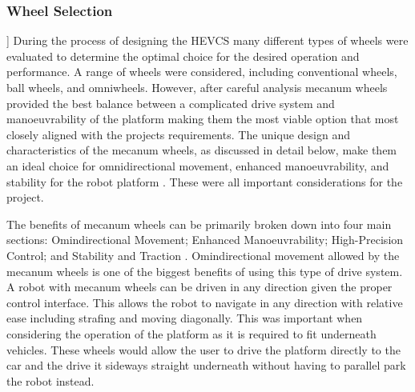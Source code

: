 \documentclass [12pt]{article}
\begin{document}
\subsubsection{Wheel Selection}]
During the process of designing the HEVCS many different types of wheels were evaluated to determine the optimal choice for the desired operation and performance. A range of wheels were considered, including conventional wheels, ball wheels, and omniwheels. However, after careful analysis mecanum wheels provided the best balance between a complicated drive system and manoeuvrability of the platform making them the most viable option that most closely aligned with the projects requirements. The unique design and characteristics of the mecanum wheels, as discussed in detail below, make them an ideal choice for omnidirectional movement, enhanced manoeuvrability, and stability for the robot platform \cite{dickerson1991control}.  These were all important considerations for the project.

The benefits of mecanum wheels can be primarily broken down into four main sections: Omindirectional Movement; Enhanced Manoeuvrability; High-Precision Control; and Stability and Traction \cite{doroftei2007omnidirectional}. Omindirectional movement allowed by the mecanum wheels is one of the biggest benefits of using this type of drive system. A robot with mecanum wheels can be driven in any direction given the proper control interface. This allows the robot to navigate in any direction with relative ease including strafing and moving diagonally. This was important when considering the operation of the platform as it is required to fit underneath vehicles. These wheels would allow the user to drive the platform directly to the car and the drive it sideways straight underneath without having to parallel park the robot instead.
\end{document}
